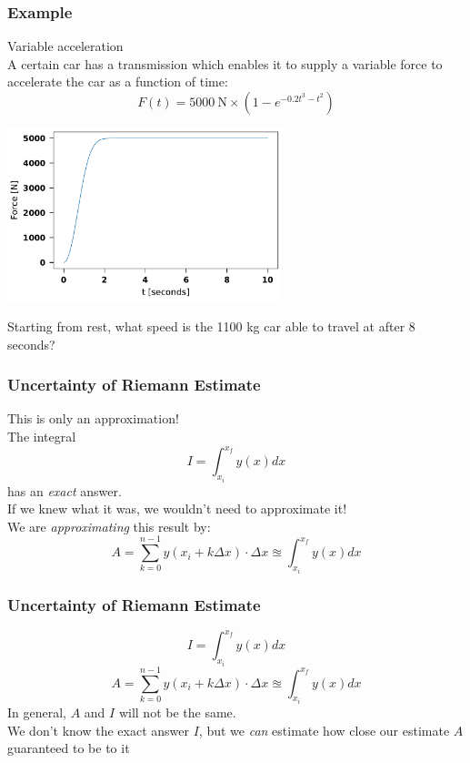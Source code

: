 \documentclass{beamer}
\begin{document}
	\begin{frame}
		\frametitle{Example}
		Variable acceleration\\
		A certain car has a transmission which enables it to supply a variable force to accelerate the car as a function of time:
		\begin{equation*}
			F(t)=5000\ \mathrm{N} \times (1-e^{-0.2t^3-t^2})
		\end{equation*}
		\begin{center}
			\includegraphics[width=8cm]{variable_force.pdf}
		\end{center}
		Starting from rest, what speed is the 1100 kg car able to travel at after 8 seconds?
	\end{frame}
	\begin{frame}
		\frametitle{Uncertainty of Riemann Estimate}
		This is only an approximation!\\
		The integral
		\begin{equation*}
				I=\int_{x_i}^{x_f}y(x)dx
		\end{equation*}
		has an \textit{exact} answer.\\
		If we knew what it was, we wouldn't need to approximate it!\\
		We are \textit{approximating} this result by:
		\begin{equation*}
			A=\sum_{k=0}^{n-1}y(x_i+k\Delta x)\cdot\Delta x\approxeq\int_{x_i}^{x_f}y(x)dx
		\end{equation*}
	\end{frame}


	\begin{frame}
	\frametitle{Uncertainty of Riemann Estimate}
	\begin{equation*}
		I=\int_{x_i}^{x_f}y(x)dx
	\end{equation*}
	\begin{equation*}
		A=\sum_{k=0}^{n-1}y(x_i+k\Delta x)\cdot\Delta x\approxeq\int_{x_i}^{x_f}y(x)dx
	\end{equation*}
	In general, $A$ and $I$ will not be the same.\\
	We don't know the exact answer $I$, but we \textit{can} estimate how close our estimate $A$ guaranteed to be to it
	\end{frame}
\end{document}
